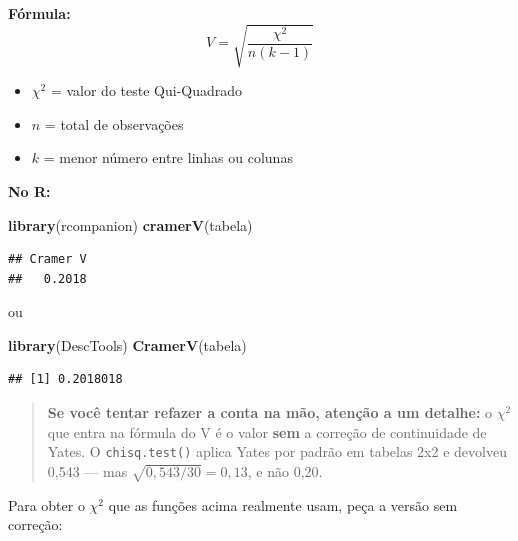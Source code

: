 \documentclass[
]{book}
\newenvironment{Shaded}{\begin{snugshade}}{\end{snugshade}}
\newcommand{\AttributeTok}[1]{\textcolor[rgb]{0.13,0.29,0.53}{#1}}
\newcommand{\ConstantTok}[1]{\textcolor[rgb]{0.56,0.35,0.01}{#1}}
\newcommand{\FunctionTok}[1]{\textcolor[rgb]{0.13,0.29,0.53}{\textbf{#1}}}
\newcommand{\NormalTok}[1]{#1}
\newcommand{\SpecialCharTok}[1]{\textcolor[rgb]{0.81,0.36,0.00}{\textbf{#1}}}
\begin{document}
\textbf{Fórmula:}
\[
V = \sqrt{\frac{\chi^2}{n(k-1)}}
\]

\begin{itemize}
\item
  \(\chi^2\) = valor do teste Qui-Quadrado
\item
  \(n\) = total de observações
\item
  \(k\) = menor número entre linhas ou colunas
\end{itemize}

\textbf{No R:}

\begin{Shaded}
\begin{Highlighting}[]
\FunctionTok{library}\NormalTok{(rcompanion)}
\FunctionTok{cramerV}\NormalTok{(tabela)}
\end{Highlighting}
\end{Shaded}

\begin{verbatim}
## Cramer V 
##   0.2018
\end{verbatim}

ou

\begin{Shaded}
\begin{Highlighting}[]
\FunctionTok{library}\NormalTok{(DescTools)}
\FunctionTok{CramerV}\NormalTok{(tabela)}
\end{Highlighting}
\end{Shaded}

\begin{verbatim}
## [1] 0.2018018
\end{verbatim}

\begin{quote}
\textbf{Se você tentar refazer a conta na mão, atenção a um detalhe:} o \(\chi^2\) que entra na fórmula do V é o valor \textbf{sem} a correção de continuidade de Yates. O \texttt{chisq.test()} aplica Yates por padrão em tabelas 2x2 e devolveu 0,543 --- mas \(\sqrt{0{,}543/30} = 0{,}13\), e não 0,20.
\end{quote}

Para obter o \(\chi^2\) que as funções acima realmente usam, peça a versão sem correção:

\begin{Shaded}
\end{Shaded}
\end{document}
